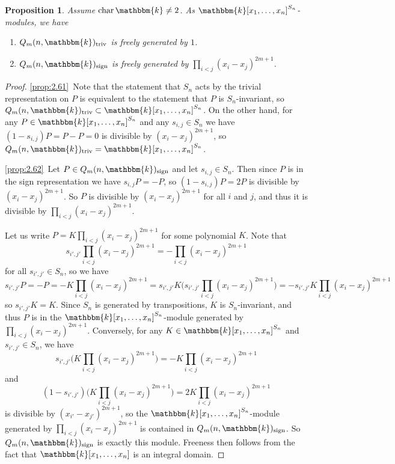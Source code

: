 \documentclass[11pt]{article}
\newtheorem{proposition}[theorem]{Proposition}
\theoremstyle{definition}
\renewcommand{\k}{\mathbbm{k}}
\newcommand{\triv}{\mathrm{triv}}
\newcommand{\sgn}{\mathrm{sign}}
\renewcommand{\char}{\text{char\,}}
\begin{document}
\begin{proposition}\label{prop:2.6} Assume $\char\k\neq 2$. As $\k[x_1,\dots,x_n]^{S_n}$-modules, we have
\begin{enumerate}
    \item $Q_m(n,\k)_\triv$ is freely generated by $1$.\label{prop:2.61}
    \item $Q_m(n,\k)_\sgn$ is freely generated by $\prod_{i<j}(x_i-x_j)^{2m+1}$.\label{prop:2.62}
\end{enumerate}
\end{proposition}
\begin{proof}
    \ref{prop:2.61}~Note that the statement that $S_n$ acts by the trivial representation on $P$ is equivalent to the statement that $P$ is $S_n$-invariant, so $Q_m(n,\k)_\triv\subset\k[x_1,\dots,x_n]^{S_n}$. On the other hand, for any $P\in\k[x_1,\dots,x_n]^{S_n}$ and any $s_{i,j}\in S_n$ we have $(1-s_{i,j})P=P-P=0$ is divisible by $(x_i-x_j)^{2m+1}$, so $Q_m(n,\k)_\triv=\k[x_1,\dots,x_n]^{S_n}$.
    
    \ref{prop:2.62}~Let $P\in Q_m(n,\k)_\sgn$ and let $s_{i,j}\in S_n$. Then since $P$ is in the sign representation we have $s_{i,j}P=-P$, so $(1-s_{i,j})P=2P$ is divisible by $(x_i-x_j)^{2m+1}$. So $P$ is divisible by $(x_i-x_j)^{2m+1}$ for all $i$ and $j$, and thus it is divisible by $\prod_{i<j}(x_i-x_j)^{2m+1}$. 
    
    Let us write $P=K\prod_{i<j}(x_i-x_j)^{2m+1}$ for some polynomial $K$. Note that 
    $$s_{i',j'}\prod_{i<j}(x_i-x_j)^{2m+1}=-\prod_{i<j}(x_i-x_j)^{2m+1}$$
    for all $s_{i',j'}\in S_n$, so we have 
    $$s_{i',j'}P=-P=-K\prod_{i<j}(x_i-x_j)^{2m+1}=s_{i',j'}K\bigg(s_{i',j'}\prod_{i<j}(x_i-x_j)^{2m+1}\bigg)=-s_{i',j'}K\prod_{i<j}(x_i-x_j)^{2m+1}$$
    so $s_{i',j'}K=K$. Since $S_n$ is generated by transpositions, $K$ is $S_n$-invariant, and thus $P$ is in the $\k[x_1,\dots,x_n]^{S_n}$-module generated by $\prod_{i<j}(x_i-x_j)^{2m+1}$. Conversely, for any $K\in\k[x_1,\dots,x_n]^{S_n}$ and $s_{i',j'}\in S_n$, we have 
    $$s_{i',j'}\Big(K\prod_{i<j}(x_i-x_j)^{2m+1}\Big)=-K\prod_{i<j}(x_i-x_j)^{2m+1}$$
    and $$(1-s_{i',j'})\Big(K\prod_{i<j}(x_i-x_j)^{2m+1}\Big)=2K\prod_{i<j}(x_i-x_j)^{2m+1}$$ is divisible by $(x_{i'}-x_{j'})^{2m+1}$, so the $\k[x_1,\dots,x_n]^{S_n}$-module generated by $\prod_{i<j}(x_i-x_j)^{2m+1}$ is contained in $Q_m(n,\k)_\sgn$. So $Q_m(n,\k)_\sgn$ is exactly this module. Freeness then follows from the fact that $\k[x_1,\dots,x_n]$ is an integral domain.
\end{proof}
\end{document}
